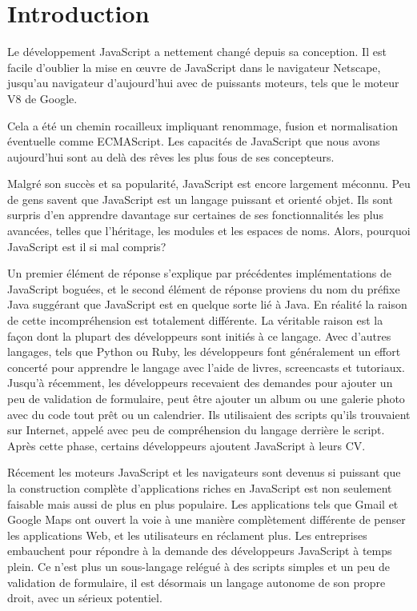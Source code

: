 \chapter{Introduction}
\label{ch:introduction}

Le développement JavaScript a nettement changé depuis sa conception. Il est facile d’oublier la mise en œuvre de JavaScript dans le navigateur Netscape, jusqu’au navigateur d’aujourd’hui avec de puissants moteurs, tels que le moteur V8 de Google.

Cela a été un chemin rocailleux impliquant renommage, fusion et normalisation éventuelle comme ECMAScript. Les capacités de JavaScript que nous avons aujourd’hui sont au delà des rêves les plus fous de ses concepteurs.

Malgré son succès et sa popularité, JavaScript est encore largement méconnu. Peu de gens savent que JavaScript est un langage puissant et orienté objet. Ils sont surpris d’en apprendre davantage sur certaines de ses fonctionnalités les plus avancées, telles que l’héritage, les modules et les espaces de noms. Alors, pourquoi JavaScript est il si mal compris?

Un premier élément de réponse s'explique par précédentes implémentations de JavaScript boguées, et le second élément de réponse proviens du nom du préfixe Java suggérant que JavaScript est en quelque sorte lié à Java. En réalité la raison de cette incompréhension est totalement différente. La véritable raison est la façon dont la plupart des développeurs sont initiés à ce langage. Avec d’autres langages, tels que Python ou Ruby, les développeurs font généralement un effort concerté pour apprendre le langage avec l’aide de livres, screencasts et tutoriaux. Jusqu’à récemment, les développeurs recevaient des demandes pour ajouter un peu de validation de formulaire, peut être ajouter un album ou une galerie photo avec du code tout prêt ou un calendrier. Ils utilisaient des scripts qu’ils trouvaient sur Internet, appelé avec peu de compréhension du langage derrière le script. Après cette phase, certains développeurs ajoutent JavaScript à leurs CV.

Récement les moteurs JavaScript et les navigateurs sont devenus si puissant que la construction complète d’applications riches en JavaScript est non seulement faisable mais aussi de plus en plus populaire. Les applications tels que Gmail et Google Maps ont ouvert la voie à une manière complètement différente de penser les applications Web, et les utilisateurs en réclament plus. Les entreprises embauchent pour répondre à la demande des développeurs JavaScript à temps plein. Ce n’est plus un sous-langage relégué à des scripts simples et un peu de validation de formulaire, il est désormais un langage autonome de son propre droit, avec un sérieux potentiel.

